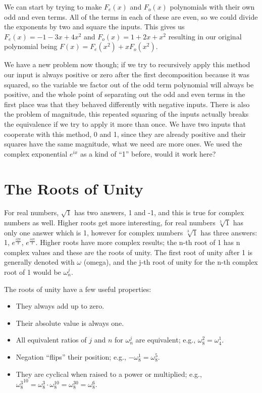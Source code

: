 \documentclass[12pt]{article}
\begin{document}
We can start by trying to make $F_e(x)$ and $F_o(x)$ polynomials with their own odd and even terms. All of the terms in each of these are even, so we could divide the exponents by two and square the inputs. This gives us $F_e(x)=-1-3x+4x^2$ and $F_o(x)=1+2x+x^2$ resulting in our original polynomial being $F(x) = F_e(x^2) + x F_o(x^2)$.

We have a new problem now though; if we try to recursively apply this method our input is always positive or zero after the first decomposition because it was squared, so the variable we factor out of the odd term polynomial will always be positive, and the whole point of separating out the odd and even terms in the first place was that they behaved differently with negative inputs. There is also the problem of magnitude, this repeated squaring of the inputs actually breaks the equivalence if we try to apply it more than once. We have two inputs that cooperate with this method, 0 and 1, since they are already positive and their squares have the same magnitude, what we need are more ones. We used the complex exponential $e^{ix}$ as a kind of ``1'' before, would it work here?
\pagebreak

\section{The Roots of Unity}

\rootsOfUnity

For real numbers, $\sqrt{1}$ has two answers, 1 and -1, and this is true for complex numbers as well. Higher roots get more interesting, for real numbers $\sqrt[3]{1}$ has only one answer which is 1, however for complex numbers $\sqrt[3]{1}$ has three answers: 1, $e^\frac{i2\pi}{3}$, $e^\frac{i4\pi}{3}$. Higher roots have more complex results; the n-th root of 1 has n complex values and these are the roots of unity. The first root of unity after 1 is generally denoted with $\omega$ (omega), and the j-th root of unity for the n-th complex root of 1 would be $\omega_n^j$.

The roots of unity have a few useful properties: 
\begin{itemize}
  \item They always add up to zero.
  \item Their absolute value is always one.
  \item All equivalent ratios of $j$ and $n$ for $\omega_n^j$ are equivalent; e.g., $\omega_8^2 = \omega_4^1$.
  \item Negation ``flips'' their position; e.g., $-\omega_8^1 = \omega_8^5$.
  \item They are cyclical when raised to a power or multiplied; e.g., ${\omega_8^3}^{10} = \omega_8^3 \cdot \omega_8^{10} = \omega_8^{30} = \omega_8^6$.
\end{itemize}
\end{document}
